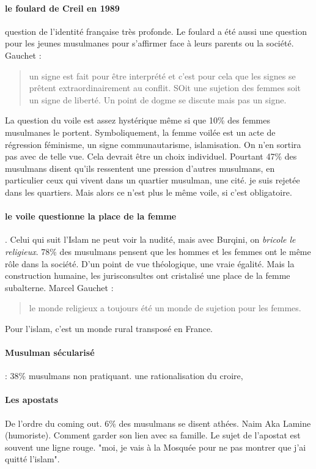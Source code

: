 \paragraph{le foulard de Creil en 1989} question de l'identité française très profonde. Le foulard a été aussi une question pour les jeunes musulmanes pour s'affirmer face à leurs parents ou la société.
Gauchet : 
\begin{quote}
    un signe est fait pour être interprété et c'est pour cela que les signes se prêtent extraordinairement au conflit.
    SOit une sujetion des femmes soit un signe de liberté. Un point de dogme se discute mais pas un signe. 
\end{quote}
La question du voile est assez hystérique même si que 10\% des femmes musulmanes le portent. Symboliquement, la femme voilée est un acte de régression féminisme, un signe communautarisme, islamisation. On n'en sortira pas avec de telle vue. Cela devrait être un choix individuel.
Pourtant 47\% des musulmans disent qu'ils ressentent une pression d'autres musulmans, en particulier ceux qui vivent dans un quartier musulman, une cité. je suis rejetée dans les quartiers. 
Mais alors ce n'est plus le même voile, si c'est obligatoire. 

\paragraph{le voile questionne la place de la femme}. Celui qui suit l'Islam ne peut voir la nudité, mais avec Burqini, on \emph{bricole le religieux}. 78\% des musulmans pensent que les hommes et les femmes ont le même rôle dans la société. 
D'un point de vue théologique, une vraie égalité. Mais la construction humaine, les jurisconsultes ont cristalisé une place de la femme subalterne. 
Marcel Gauchet : 
\begin{quote}
    le monde religieux a toujours été un monde de sujetion pour les femmes.
\end{quote}
Pour l'islam, c'est un monde rural transposé en France. 

\paragraph{Musulman sécularisé} : 38\% musulmans non pratiquant. une rationalisation du croire, 

\paragraph{Les apostats} De l'ordre du coming out. 6\% des musulmans se disent athées.  Naim Aka Lamine (humoriste). Comment garder son lien avec sa famille. Le sujet de l'apostat est souvent une ligne rouge. "moi, je vais à la Mosquée pour ne pas montrer que j'ai quitté l'islam". 


